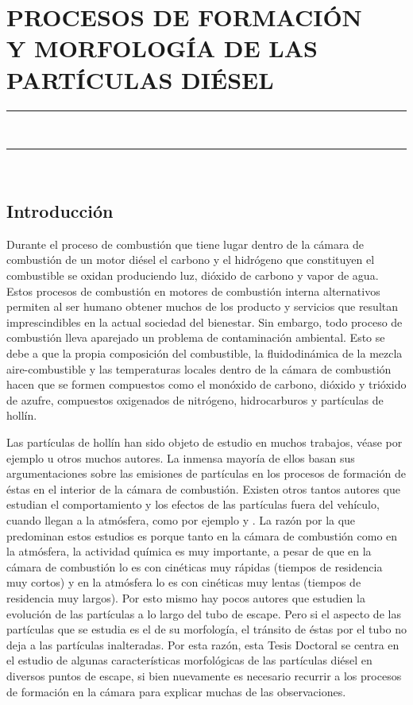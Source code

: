 \pagestyle{plain}
\chapter{PROCESOS DE FORMACIÓN \\ Y MORFOLOGÍA DE LAS PARTÍCULAS DIÉSEL} \label{cap:ProcesosFormacionyMorfologia}
\noindent\rule{\linewidth}{1.3pt}\\
\startcontents[chapters]
\noindent\rule{\linewidth}{1.1pt}\\
\newpage
\section{Introducción} \label{sec:Introduccion}

\par Durante el proceso de combustión que tiene lugar dentro de la cámara de combustión de un motor diésel el carbono y el hidrógeno que constituyen el combustible se oxidan produciendo luz, dióxido de carbono y vapor de agua. Estos procesos de combustión en motores de combustión interna alternativos permiten al ser humano obtener muchos de los producto y servicios que resultan imprescindibles en la actual sociedad del bienestar. Sin embargo, todo proceso de combustión lleva aparejado un problema de contaminación ambiental. Esto se debe a que la propia composición del combustible, la fluidodinámica de la mezcla aire-combustible y las temperaturas locales dentro de la cámara de combustión hacen que se formen compuestos como el  monóxido de carbono, dióxido y trióxido de azufre, compuestos oxigenados de nitrógeno, hidrocarburos y partículas de  hollín. 

\par Las partículas de hollín han sido objeto de estudio en muchos trabajos, véase por ejemplo \cite{chariphD:2002} u otros muchos autores. La inmensa mayoría de ellos basan sus argumentaciones sobre las emisiones de partículas en los procesos de formación de éstas en el interior de la cámara de combustión. Existen otros tantos autores que estudian el comportamiento y los efectos de las partículas fuera del vehículo, cuando llegan a la atmósfera, como por ejemplo \cite{kimetal:2001} y \cite{siegmannetal:1999}. La razón por la que predominan estos estudios es porque tanto en la cámara de combustión como en la atmósfera, la actividad química es muy importante, a pesar de que en la cámara de combustión lo es con cinéticas muy rápidas (tiempos de residencia muy cortos) y en la atmósfera lo es con cinéticas muy lentas (tiempos de residencia muy largos). Por esto mismo hay pocos autores que estudien la evolución de las partículas a lo largo del tubo de escape. Pero si el aspecto de las partículas que se estudia es el de su morfología, el tránsito de éstas por el tubo no deja a las partículas inalteradas. Por esta razón, esta Tesis Doctoral se centra en el estudio de algunas características morfológicas de las partículas diésel en diversos puntos de escape, si bien nuevamente es necesario recurrir a los procesos de formación en la cámara para explicar muchas de las observaciones.

